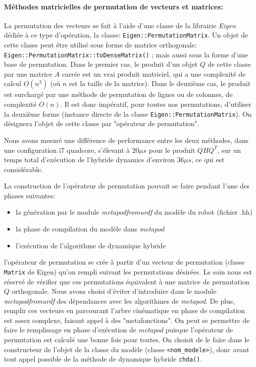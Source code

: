 \documentclass{report}
\begin{document}
\paragraph{Méthodes matricielles de permutation de vecteurs et matrices:}
La permutation des vecteurs se fait à l'aide d'une classe de la librairie \emph{Eigen} dédiée à ce type d'opération, la classe: \verb;Eigen::PermutationMatrix;. Un objet de cette classe peut être utilisé sous forme de matrice orthogonale: \verb;Eigen::PermutationMatrix::toDenseMatrix(); ; mais aussi sous la forme d'une base de permutation. Dans le premier cas, le produit d'un objet $Q$ de cette classe par une matrice $A$ carrée est un vrai produit matriciel, qui a une complexité de calcul $O(n^3)$ (où $n$ est la taille de la matrice). Dans le deuxième cas, le produit est surchargé par une méthode de permutation de lignes ou de colonnes, de complexité $O(n)$. Il est donc impératif, pour toutes nos permutations, d'utiliser la deuxième forme (instance directe de la classe \verb;Eigen::PermutationMatrix;). On désignera l'objet de cette classe par "opérateur de permutation".

Nous avons mesuré une différence de performance entre les deux méthodes, dans une configuration i7 quadcore, s'élevant à $20\mu s$ pour le produit $Q H Q^T$, sur un temps total d'exécution de l'hybride dynamics d'environ $36\mu s$, ce qui est considérable.

La construction de l'opérateur de permutation pouvait se faire pendant l'une des phases suivantes:
\begin{itemize}
  \item la génération par le module \emph{metapodfromurdf} du modèle du robot (fichier .hh)
  \item la phase de compilation du modèle dans \emph{metapod}
  \item l'exécution de l'algorithme de dynamique hybride
\end{itemize}
l'opérateur de permutation se crée à partir d'un vecteur de permutation (classe \verb;Matrix; de Eigen) qu'on rempli suivant les permutations désirées. Le soin nous est réservé de vérifier que ces permutations équivalent à une matrice de permutation $Q$ orthogonale. Nous avons choisi d'éviter d'introduire dans le module \emph{metapodfromurdf} des dépendances avec les algorithmes de \emph{metapod}. De plus, remplir ces vecteurs en parcourant l'arbre cinématique en phase de compilation est assez complexe, faisant appel à des "metafonctions". On peut se permettre de faire le remplissage en phase d'exécution de \emph{metapod} puisque l'opérateur de permutation est calculé une bonne fois pour toutes. On choisit de le faire dans le constructeur de l'objet de la classe du modèle (classe \verb;<nom_modele>;), donc avant tout appel possible de la méthode de dynamique hybride \verb;chda();.
\end{document}
